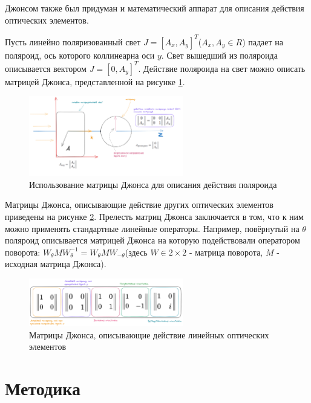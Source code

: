 \documentclass[14pt, singlecolumn, citestyle=authoryear]{elegantbook}
\begin{document}
Джонсом также был придуман и математический аппарат для описания действия оптических элементов.

Пусть линейно поляризованный свет $J = [A_x, A_y]^{T}$($A_{x}, A_{y} \in R$) падает на поляроид, ось которого коллинеарна оси $y$. Свет вышедший из поляроида описывается вектором $J = [0, A_y]^{T}$. Действие поляроида на свет можно описать матрицей Джонса, представленной на рисунке \ref{fig:polaroid_responce_matrix}.

\newpage

\begin{figure}[htbp]
  \centering
  \includegraphics[width= 0.6\textwidth]{stokes_2.png}
  \caption{Использование матрицы Джонса для описания действия поляроида}
  \label{fig:polaroid_responce_matrix}
\end{figure}

Матрицы Джонса, описывающие действие других оптических элементов приведены на рисунке \ref{fig:jones_matricies_examples}. Прелесть матриц Джонса заключается в том, что к ним можно применять стандартные линейные операторы. Например, повёрнутый на $\theta$ поляроид описывается матрицей Джонса на которую подействовали оператором поворота: $W_{\theta} M W_{\theta}^{-1} = W_{\theta} M W_{-\theta}$(здесь $W \in 2 \times 2 $ - матрица поворота, $M$ - исходная матрица Джонса). 

\begin{figure}[htbp]
  \centering
  \includegraphics[width= 0.6\textwidth]{polaroid_table.png}
  \caption{Матрицы Джонса, описывающие действие линейных оптических элементов}
  \label{fig:jones_matricies_examples}
\end{figure}

\hspace*{1em}
\chapter*{Методика}
\end{document}
